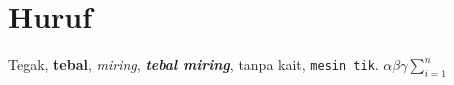 \documentclass[11pt,a4paper]{report}
\begin{document}
\chapter{Huruf}
Tegak, \textbf{tebal}, \textit{miring}, \textbf{\textit{tebal miring}},
\textsf{tanpa kait}, \texttt{mesin tik}. $\alpha\beta\gamma \sum_{i=1}^{n}$
\end{document}
